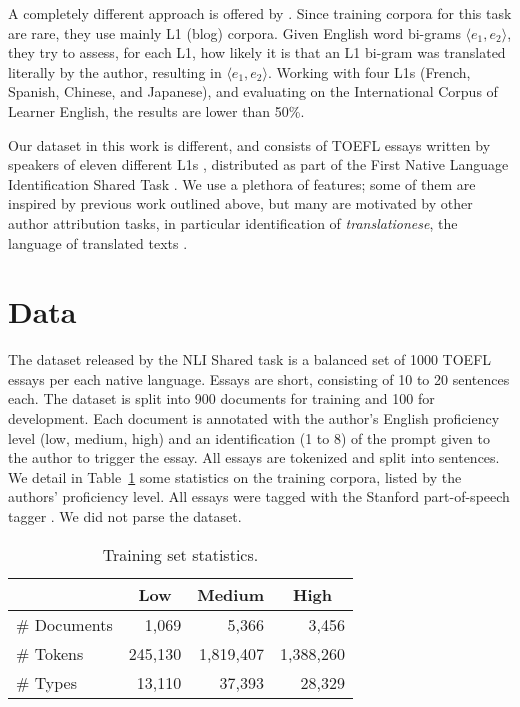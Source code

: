\documentclass[11pt,letterpaper]{article}
\newcommand{\Tref}[1]{Table~\ref{#1}}
\begin{document}
A completely different approach is offered by
\citet{brooke2011native}. Since training corpora for this task are
rare, they use mainly L1 (blog) corpora. Given English word bi-grams
$\langle e_1,e_2\rangle$, they try to assess, for each L1, how likely
it is that an L1 bi-gram was translated literally by the author,
resulting in $\langle e_1,e_2\rangle$. Working with four L1s (French,
Spanish, Chinese, and Japanese), and evaluating on the International
Corpus of Learner English, the results are lower than 50\%.

Our dataset in this work is different, and consists of TOEFL essays
written by speakers of eleven different L1s
\citep{blanchard-tetreault-higgins-cahill-chodorow:2013:TOEFL11-RR},
distributed as part of the First Native Language Identification Shared
Task \citep{tetreault-blanchard-cahill:2013:BEA}. We use a plethora of
features; some of them are inspired by previous work outlined above,
but many are motivated by other author attribution tasks, in
particular identification of \emph{translationese}, the language of
translated texts \citep{vered:noam:shuly}.

\section{Data}
\label{sec:data}
The dataset released by the NLI Shared task \citep{tetreault-EtAl:2012:PAPERS} is a balanced set of 1000 TOEFL essays per each native language. Essays are short, consisting of 10 to 20 sentences each. The dataset is split into 900 documents for training and 100 for development. Each document is annotated with the author's English proficiency level (low, medium, high) and an identification (1 to 8) of the prompt given to the author to trigger the essay. All essays are tokenized and split into sentences. We detail in \Tref{tbl:stats:level} some statistics on the training corpora, listed by the authors' proficiency level. All essays were tagged with the Stanford part-of-speech tagger
\citep{toutanova-03}. We did not parse the dataset.

\begin{table}[hbt]
\small\centering
\begin{tabular}{lrrr}
  & \multicolumn{1}{c}{\textbf{Low}} & \multicolumn{1}{c}{\textbf{Medium}} & \multicolumn{1}{c}{\textbf{High}} \\
\hline
\# Documents & 1,069 & 5,366 & 3,456 \\
\# Tokens & 245,130 & 1,819,407 & 1,388,260 \\ 
\# Types & 13,110 & 37,393 & 28,329 \\ 
\end{tabular}
\caption{Training set statistics.}
\label{tbl:stats:level}
\end{table} 
\end{document}

